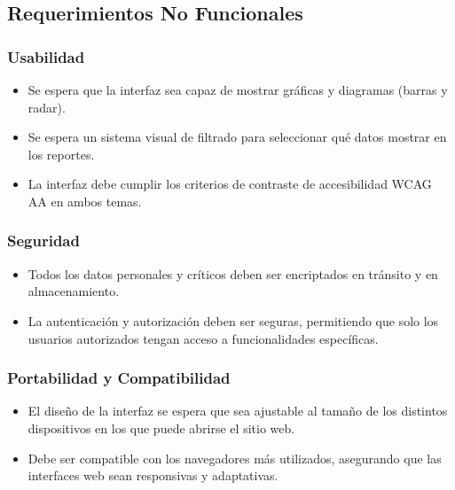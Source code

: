 \documentclass{report}
\begin{document}
        \vspace{1cm}

        \subsection*{Requerimientos No Funcionales}

            \vspace{0.3cm}

            \subsubsection*{Usabilidad}
            \begin{itemize}
                \item Se espera que la interfaz sea capaz de mostrar gráficas y diagramas (barras y radar).
                \item Se espera un sistema visual de filtrado para seleccionar qué datos mostrar en los reportes.
                \item La interfaz debe cumplir los criterios de contraste de accesibilidad WCAG AA en ambos temas.
            \end{itemize}
        
            \subsubsection*{Seguridad}
            \begin{itemize}
                \item Todos los datos personales y críticos deben ser encriptados en tránsito y en almacenamiento.
                \item La autenticación y autorización deben ser seguras, permitiendo que solo los usuarios 
                autorizados tengan acceso a funcionalidades específicas.
            \end{itemize}
        
            \subsubsection*{Portabilidad y Compatibilidad}
            \begin{itemize}
                \item El diseño de la interfaz se espera que sea ajustable al tamaño de los distintos dispositivos 
                en los que puede abrirse el sitio web.
                \item Debe ser compatible con los navegadores más utilizados, asegurando que las interfaces web 
                sean responsivas y adaptativas.
            \end{itemize}
        
\end{document}
